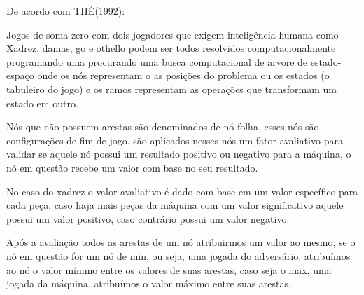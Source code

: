 De acordo com THÉ(1992):
\begin{citacao}
    Jogos de soma-zero com dois jogadores que exigem inteligência humana como Xadrez, damas, go e othello
    podem ser todos resolvidos computacionalmente programando uma procurando uma busca computacional de
    arvore de estado-espaço onde os nós representam o as posições do problema ou os estados (o tabuleiro do jogo)
    e os ramos representam as operações que transformam um estado em outro.\cite[tradução nossa.]{ERICTHE}
\end{citacao}

Nós que não possuem arestas são denominados de nó folha, esses nós são configurações de fim de jogo, são aplicados nesses nós um fator avaliativo
para validar se aquele nó possui um resultado positivo ou negativo para a máquina, o nó em questão recebe um valor com base no seu resultado.

No caso do xadrez o valor avaliativo é dado com base em um valor específico para cada peça, caso haja mais peças da máquina com um valor
significativo aquele  possui um valor positivo, caso contrário possui um valor negativo.

Após a avaliação todos as arestas de um nó atribuirmos um valor ao mesmo, se o nó em questão for um nó de min, ou seja, uma jogada
do adversário, atribuímos ao nó o valor mínimo entre os valores de suas arestas, caso seja o max, uma jogada da máquina, atribuímos
o valor máximo entre suas arestas.

